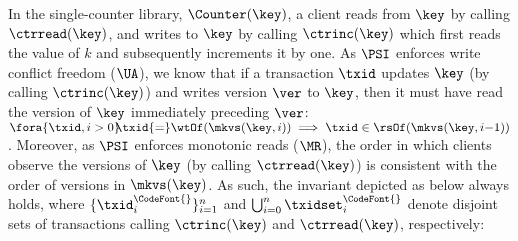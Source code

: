 In the single-counter library, $\Counter(\key)$, 
a client reads from $\key$ by calling $\ctrread(\key)$, and writes to $\key$ by calling $\ctrinc(\key)$ 
which first reads the value of $k$ and subsequently increments it by one.
As $\PSI$ enforces write conflict freedom (\(\UA\)),
we know that if a transaction $\txid$ updates $\key$ (by calling $\ctrinc(\key)$) and writes version $\ver$ to $\key$, 
then it must have read the version of $\key$ immediately preceding $\ver$:
$\fora{\txid, i > 0}\!\! \txid {=} \wtOf(\mkvs(\key, i)) \implies \txid \in \rsOf(\mkvs(\key, i{-}1))$. 
Moreover, as $\PSI$ enforces monotonic reads ($\MR$),
the order in which clients observe the versions of $\key$ (by calling $\ctrread(\key)$)
is consistent with the order of versions in $\mkvs(\key)$. 
As such, the invariant depicted as below always holds, where  
$\{\txid^{\CodeFont{}}_{i}\}_{i=1}^{n}$ and $\bigcup_{i=0}^{n} \txidset^{\CodeFont{}}_{i}$ 
denote disjoint sets of transactions calling $\ctrinc(\key)$ and $\ctrread(\key)$, respectively:\\[3pt]
%
\noindent
\ 
